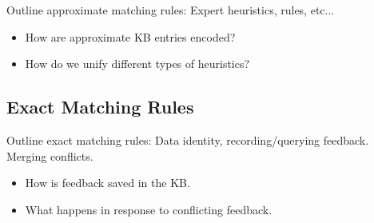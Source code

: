 Outline approximate matching rules: Expert heuristics, rules, etc...
\begin{itemize}
  \item How are approximate KB entries encoded?
  \item How do we unify different types of heuristics?
\end{itemize}


\subsection{Exact Matching Rules}

Outline exact matching rules: Data identity, recording/querying feedback.  Merging conflicts.

\begin{itemize}
  \item How is feedback saved in the KB.
  \item What happens in response to conflicting feedback.  
\end{itemize}
